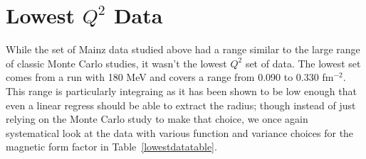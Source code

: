 \documentclass[10pt,aps,prc,twocolumn]{revtex4-1}
\begin{document}
\section{Lowest $Q^2$ Data} 

While the set of Mainz data studied above had a range similar to the large range of classic Monte Carlo studies, it wasn't
the lowest $Q^2$ set of data.   The lowest set comes from a run with 180 MeV 
and covers a range from 0.090 to 0.330 fm$^{-2}$.   This range is particularly integraing as it has been shown to be
low enough that even a linear regress should be able to extract the radius; though instead of just relying on the Monte
Carlo study to make that choice, we once again systematical look at the data with various function and variance choices
for the magnetic form factor in Table~\ref{lowestdatatable}.
\end{document}
